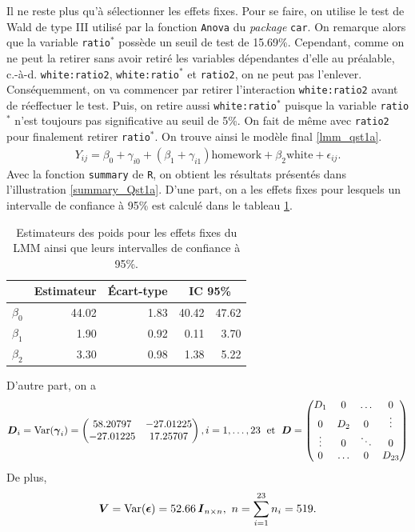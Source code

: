 \documentclass{article}
\begin{document}
		Il ne reste plus qu'à sélectionner les effets fixes. Pour se faire, on utilise le test de Wald de type III utilisé par la fonction \texttt{Anova} du \textit{package} \texttt{car}.
		On remarque alors que la variable \texttt{ratio}$^*$ possède un seuil de test de 15.69\%. Cependant, comme on ne peut la retirer sans avoir retiré les variables dépendantes d'elle au préalable, c.-à-d. \texttt{white:ratio2}, \texttt{white:ratio}$^*$ et \texttt{ratio2}, on ne peut pas l'enlever. Conséquemment, on va commencer par retirer l'interaction \texttt{white:ratio2} avant de réeffectuer le test. Puis, on retire aussi \texttt{white:ratio}$^*$ puisque la variable \texttt{ratio}$^*$ n'est toujours pas significative au seuil de 5\%. On fait de même avec \texttt{ratio2} pour finalement retirer \texttt{ratio}$^*$. On trouve ainsi le modèle final \eqref{lmm_qst1a}.
		\begin{align}\label{lmm_qst1a}
			Y_{ij} = \beta_0+\gamma_{i0} + (\beta_1 + \gamma_{i1}) \mathrm{homework} + \beta_2 \mathrm{white} + \epsilon_{ij}.
		\end{align}
		Avec la fonction \texttt{summary} de \texttt{R}, on obtient les résultats présentés dans l'illustration \ref{summary_Qst1a}. D'une part, on a les effets fixes pour lesquels un intervalle de confiance à 95\% est calculé dans le tableau \ref{tbl_effets_fixes_qst1a}.
		\begin{table}[H]
			\centering
			\begin{tabular}{lrrrr}
				\hline
				& Estimateur & Écart-type & \multicolumn{2}{c}{IC 95\%} \\ 
				\hline
				$\beta_0$ & 44.02 & 1.83 & 40.42 & 47.62 \\ 
				$\beta_1$ & 1.90 & 0.92 & 0.11 & 3.70 \\ 
				$\beta_2$ & 3.30 & 0.98 & 1.38 & 5.22 \\ 
				\hline
			\end{tabular}
		\caption{Estimateurs des poids pour les effets fixes du LMM ainsi que leurs intervalles de confiance à 95\%.}
		\label{tbl_effets_fixes_qst1a}
		\end{table}
		D'autre part, on a 
		\begin{align}
			\boldsymbol{D}_i = \mathrm{Var}(\boldsymbol{\gamma}_i) = 
			\begin{pmatrix}
				58.20797 & -27.01225 \\
				-27.01225& 17.25707  \\
			\end{pmatrix},
			i=1,\dots,23
			\; \text{ et }\;
			\boldsymbol{D} = 
			\begin{pmatrix}
				D_1 & 0 & \dots & 0 \\
				0 & D_2 & 0 & \vdots \\
				\vdots & 0 & \ddots & 0 \\
				0 & \dots & 0 & D_{23}
			\end{pmatrix}
		\end{align}
		De plus,
		\begin{align}
			\boldsymbol{V} = \mathrm{Var}(\boldsymbol{\epsilon}) = 
			52.66\, \boldsymbol{I}_{n\times n},
			\ n=\sum_{i=1}^{23} n_i = 519.
		\end{align}
	
\end{document}
